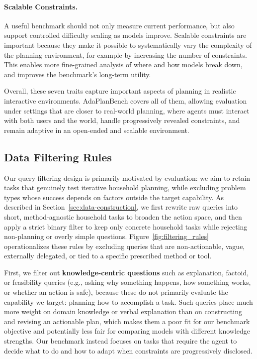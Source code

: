 \documentclass{llmxive}
\providecommand{\bench}[1]{AdaPlanBench}
\begin{document}
\paragraph{Scalable Constraints.}
A useful benchmark should not only measure current performance, but also support controlled difficulty scaling as models improve. 
Scalable constraints are important because they make it possible to systematically vary the complexity of the planning environment, for example by increasing the number of constraints.
This enables more fine-grained analysis of where and how models break down, and improves the benchmark's long-term utility.

Overall, these seven traits capture important aspects of planning in realistic interactive environments. \bench{} covers all of them, allowing evaluation under settings that are closer to real-world planning, where agents must interact with both users and the world, handle progressively revealed constraints, and remain adaptive in an open-ended and scalable environment.

\subsection{Data Filtering Rules}
\label{app:data_filtering_rule_exp}

Our query filtering design is primarily motivated by evaluation: we aim to retain tasks that genuinely test iterative household planning, while excluding problem types whose success depends on factors outside the target capability. 
As described in Section~\ref{sec:data-construction}, we first rewrite raw queries into short, method-agnostic household tasks to broaden the action space, and then apply a strict binary filter to keep only concrete household tasks while rejecting non-planning or overly simple questions. 
Figure~\ref{fig:filtering_rules} operationalizes these rules by excluding queries that are non-actionable, vague, externally delegated, or tied to a specific prescribed method or tool.

First, we filter out \textbf{knowledge-centric questions} such as explanation, factoid, or feasibility queries (e.g., asking why something happens, how something works, or whether an action is safe), because these do not primarily evaluate the capability we target: planning how to accomplish a task. 
Such queries place much more weight on domain knowledge or verbal explanation than on constructing and revising an actionable plan, which makes them a poor fit for our benchmark objective and potentially less fair for comparing models with different knowledge strengths. 
Our benchmark instead focuses on tasks that require the agent to decide what to do and how to adapt when constraints are progressively disclosed.
\end{document}
